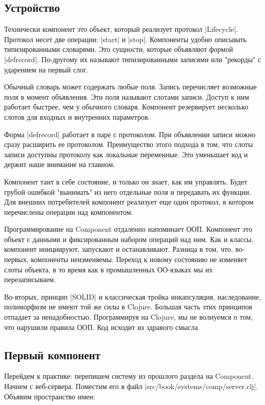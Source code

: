 \subsection{Устройство}

Технически компонент это объект, который реализует протокол
\spverb|Lifecycle|. Протокол несет две операции: \spverb|start| и \spverb|stop|. Компоненты удобно
описывать типизированными словарями. Это сущности, которые объявляют формой
\spverb|defrecord|. По-другому их называют типизированными записями или "рекорды" с
ударением на первый слог.

Обычный словарь может содержать любые поля. Запись перечисляет возможные поля в
момент объявления. Эти поля называют слотами записи. Доступ к ним работает
быстрее, чем у обычного словаря. Компонент резервирует несколько слотов для
входных и внутренних параметров.

Форма \spverb|defrecord| работает в паре с протоколом. При объявлении записи можно
сразу расширить ее протоколом. Преимущество этого подхода в том, что слоты
записи доступны протоколу как локальные переменные. Это уменьшает код и держит
наше внимание на главном.

Компонент таит в себе состояние, и только он знает, как им управлять. Будет
грубой ошибкой "вынимать" из него отдельные поля и передавать их функции. Для
внешних потребителей компонент реализует еще один протокол, в котором
перечислены операции над компонентом.

Программирование на Component отдаленно напоминает ООП. Компонент это объект с
данными и фиксированным набором операций над ним. Как и классы, компонент
инициируют, запускают и останавливают. Разница в том, что, во-первых, компоненты
неизменяемы. Переход к новому состоянию не изменяет слоты объекта, в то время
как в промышленных ОО-языках мы их перезаписываем.

Во-вторых, принцип \spverb|SOLID| и классическая тройка инкапсуляция, наследование,
полиморфизм не имеют той же силы в Clojure. Большая часть этих принципов
отпадает за ненадобностью. Программируя на Clojure, мы не волнуемся о том, что
нарушили правила ООП. Код исходит из здравого смысла.

\subsection{Первый компонент}

Перейдем к практике: перепишем систему из прошлого раздела на Component. Начнем
с веб-сервера. Поместим его в файл \spverb|src/book/systems/comp/server.clj|. Объявим
пространство имен:

